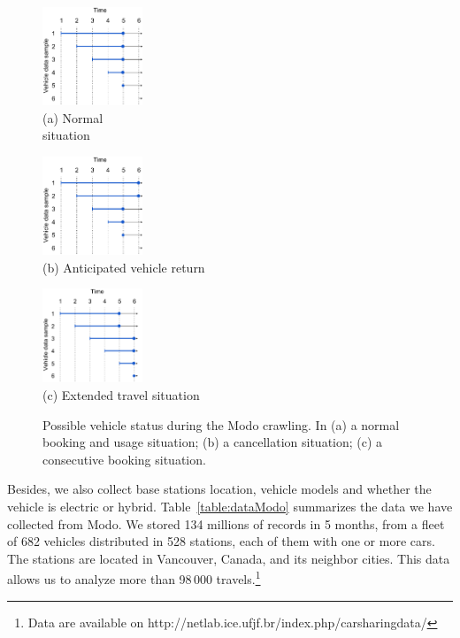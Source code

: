 \begin{figure}[!htb]
    \medskip
    \begin{minipage}[b]{0.32\linewidth}
    \centering
     \includegraphics[width=30mm]{modo_methodology/Normal_Situation.pdf}
     {\\(a) Normal \\situation}
    \end{minipage}
    \begin{minipage}[b]{0.32\linewidth}
     \centering
     \includegraphics[width=30mm]{modo_methodology/Cancelation_Situation.pdf}
     {\\(b) Anticipated vehicle return}
    \end{minipage}
    \begin{minipage}[b]{0.32\linewidth}
     \centering
     \includegraphics[width=30mm]{modo_methodology/Consecutive_without_legend.pdf}
     {\\(c) Extended travel situation}
    \end{minipage}
    \caption{Possible vehicle status during the Modo crawling. In (a) a normal booking and usage situation; (b) a cancellation situation; (c) a consecutive booking situation.}
    \label{fig:capturas}
\end{figure}

Besides, we also collect base stations location, vehicle models and whether the vehicle is electric or hybrid. 
Table~\ref{table:dataModo} summarizes the data we have collected from Modo. We stored 134 millions of records in 5 months, from a fleet of 682 vehicles distributed in 528 stations, each of them with one or more cars. The stations are located in Vancouver, Canada, and its neighbor cities. This data allows us to analyze more than %
98\,000 travels.\footnote{Data are available on http://netlab.ice.ufjf.br/index.php/carsharingdata/}

